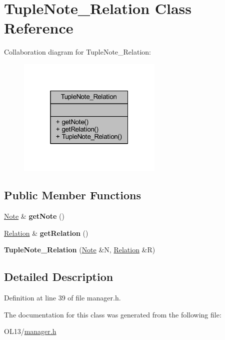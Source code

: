 \hypertarget{class_tuple_note___relation}{}\section{Tuple\+Note\+\_\+\+Relation Class Reference}
\label{class_tuple_note___relation}


Collaboration diagram for Tuple\+Note\+\_\+\+Relation\+:
\nopagebreak
\begin{figure}[H]
\begin{center}
\leavevmode
\includegraphics[width=196pt]{class_tuple_note___relation__coll__graph}
\end{center}
\end{figure}
\subsection*{Public Member Functions}
\begin{DoxyCompactItemize}
\item 
\mbox{\label{class_tuple_note___relation_a2bb8e84363d2bab8cd03742144a06ef9}} 
\hyperlink{class_note}{Note} \& {\bfseries get\+Note} ()
\item 
\mbox{\label{class_tuple_note___relation_a0e6d2fca79e715c85d4a4793da2bb381}} 
\hyperlink{class_relation}{Relation} \& {\bfseries get\+Relation} ()
\item 
\mbox{\label{class_tuple_note___relation_adc3d9a6e637361eedd2e561ae957e1fb}} 
{\bfseries Tuple\+Note\+\_\+\+Relation} (\hyperlink{class_note}{Note} \&N, \hyperlink{class_relation}{Relation} \&R)
\end{DoxyCompactItemize}


\subsection{Detailed Description}


Definition at line 39 of file manager.\+h.



The documentation for this class was generated from the following file\+:\begin{DoxyCompactItemize}
\item 
O\+L13/\hyperlink{manager_8h}{manager.\+h}\end{DoxyCompactItemize}
